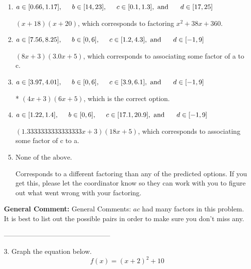 \documentclass{extbook}[14pt]
\begin{document}
\begin{enumerate}[label=\Alph*.] 
\item $ a \in [0.66, 1.17], \hspace*{5mm} b \in [14, 23], \hspace*{5mm} c \in [0.1, 1.3], \text{ and } \hspace*{5mm} d \in [17, 25] $ 

  $(x + 18)(x + 20)$, which corresponds to factoring $x^{2} +38 x + 360$. 
\item $ a \in [7.56, 8.25], \hspace*{5mm} b \in [0, 6], \hspace*{5mm} c \in [1.2, 4.3], \text{ and } \hspace*{5mm} d \in [-1, 9] $ 

  $(8x + 3)(3.0x + 5)$, which corresponds to associating some factor of a to c. 
\item $ a \in [3.97, 4.01], \hspace*{5mm} b \in [0, 6], \hspace*{5mm} c \in [3.9, 6.1], \text{ and } \hspace*{5mm} d \in [-1, 9] $ 

 * $(4x + 3)(6x + 5)$, which is the correct option. 
\item $ a \in [1.22, 1.4], \hspace*{5mm} b \in [0, 6], \hspace*{5mm} c \in [17.1, 20.9], \text{ and } \hspace*{5mm} d \in [-1, 9] $ 

  $(1.3333333333333333x + 3)(18x + 5)$, which corresponds to associating some factor of c to a. 
\item $ \text{None of the above.} $ 

  Corresponds to a different factoring than any of the predicted options. If you get this, please let the coordinator know so they can work with you to figure out what went wrong with your factoring. 
\end{enumerate} 
 
\textbf{General Comment:} General Comments: $ac$ had many factors in this problem. It is best to list out the possible pairs in order to make sure you don't miss any. 

-----------------------------------------------

3. Graph the equation below.
\[ f(x) = (x+2)^2 + 10 \] 
\end{document}
